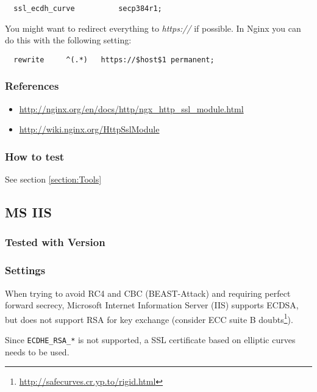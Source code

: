 \begin{lstlisting}
  ssl_ecdh_curve          secp384r1;
\end{lstlisting}

You might want to redirect everything to \emph{https://} if possible. In Nginx you can do this with the following setting:

\begin{lstlisting}
  rewrite     ^(.*)   https://$host$1 permanent;
\end{lstlisting}


\subsubsection{References} 
\begin{itemize}
  \item \url{http://nginx.org/en/docs/http/ngx_http_ssl_module.html}
  \item \url{http://wiki.nginx.org/HttpSslModule}
\end{itemize}

\subsubsection{How to test}
See section \ref{section:Tools}

\subsection{MS IIS}
\label{sec:ms-iis}


\subsubsection{Tested with Version} 


\subsubsection{Settings}

When trying to avoid RC4 and CBC (BEAST-Attack) and requiring perfect
forward secrecy, Microsoft Internet Information Server (IIS) supports
ECDSA, but does not support RSA for key exchange (consider ECC suite
B doubts\footnote{\url{http://safecurves.cr.yp.to/rigid.html}}).

Since \verb|ECDHE_RSA_*| is not supported, a SSL certificate based on
elliptic curves needs to be used.

